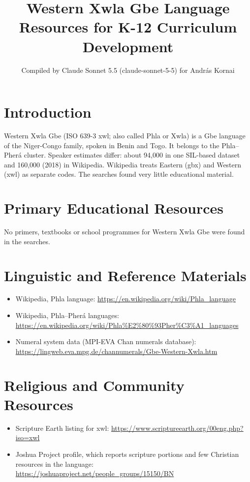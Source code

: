 \documentclass[12pt]{article}
\title{Western Xwla Gbe Language Resources for K-12 Curriculum Development}
\author{Compiled by Claude Sonnet 5.5 (claude-sonnet-5-5) for Andr\'as Kornai}
\date{}
\begin{document}
\maketitle

\section{Introduction}
Western Xwla Gbe (ISO 639-3 xwl; also called Phla or Xwla) is a Gbe language of the Niger-Congo family, spoken in Benin and Togo. It belongs to the Phla--Pher\'a cluster. Speaker estimates differ: about 94,000 in one SIL-based dataset and 160,000 (2018) in Wikipedia. Wikipedia treats Eastern (gbx) and Western (xwl) as separate codes. The searches found very little educational material.

\section{Primary Educational Resources}
No primers, textbooks or school programmes for Western Xwla Gbe were found in the searches.

\section{Linguistic and Reference Materials}
\begin{itemize}
\item Wikipedia, Phla language: \url{https://en.wikipedia.org/wiki/Phla_language}
\item Wikipedia, Phla--Pher\'a languages: \url{https://en.wikipedia.org/wiki/Phla%E2%80%93Pher%C3%A1_languages}
\item Numeral system data (MPI-EVA Chan numerals database): \url{https://lingweb.eva.mpg.de/channumerals/Gbe-Western-Xwla.htm}
\end{itemize}

\section{Religious and Community Resources}
\begin{itemize}
\item Scripture Earth listing for xwl: \url{https://www.scriptureearth.org/00eng.php?iso=xwl}
\item Joshua Project profile, which reports scripture portions and few Christian resources in the language: \url{https://joshuaproject.net/people_groups/15150/BN}
\end{itemize}
\end{document}

